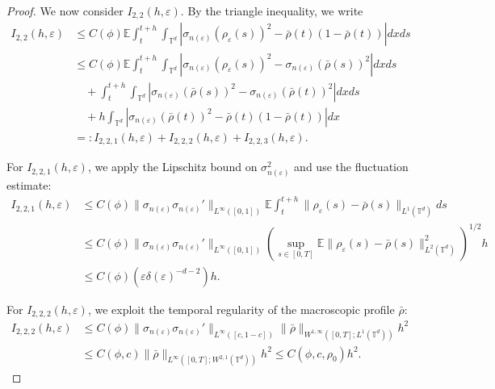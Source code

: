 \documentclass[10pt,a4paper]{amsart}
\def\leq{\leqslant}
\begin{document}
\begin{proof}
\medskip

We now consider $ I_{2,2}(h,\varepsilon) $. By the triangle inequality, we write
\begin{align*}
I_{2,2}(h,\varepsilon)
&\leq C(\phi) \mathbb{E} \int_t^{t+h} \int_{\mathbb{T}^d} \left| \sigma_{n(\varepsilon)}(\rho_{\varepsilon}(s))^2 - \bar{\rho}(t)(1 - \bar{\rho}(t)) \right| dx ds \\
&\leq C(\phi) \mathbb{E} \int_t^{t+h} \int_{\mathbb{T}^d} \left| \sigma_{n(\varepsilon)}(\rho_{\varepsilon}(s))^2 - \sigma_{n(\varepsilon)}(\bar{\rho}(s))^2 \right| dx ds \\
&\quad + \int_t^{t+h} \int_{\mathbb{T}^d} \left| \sigma_{n(\varepsilon)}(\bar{\rho}(s))^2 - \sigma_{n(\varepsilon)}(\bar{\rho}(t))^2 \right| dx ds \\
&\quad + h \int_{\mathbb{T}^d} \left| \sigma_{n(\varepsilon)}(\bar{\rho}(t))^2 - \bar{\rho}(t)(1 - \bar{\rho}(t)) \right| dx \\
&=: I_{2,2,1}(h,\varepsilon) + I_{2,2,2}(h,\varepsilon) + I_{2,2,3}(h,\varepsilon).
\end{align*}

For $ I_{2,2,1}(h,\varepsilon) $, we apply the Lipschitz bound on $ \sigma_{n(\varepsilon)}^2 $ and use the fluctuation estimate:
\begin{align*}
I_{2,2,1}(h,\varepsilon)
&\leq C(\phi) \| \sigma_{n(\varepsilon)} \sigma_{n(\varepsilon)}' \|_{L^{\infty}([0,1])} 
\mathbb{E} \int_t^{t+h} \| \rho_{\varepsilon}(s) - \bar{\rho}(s) \|_{L^1(\mathbb{T}^d)} ds \\
&\leq C(\phi) \| \sigma_{n(\varepsilon)} \sigma_{n(\varepsilon)}' \|_{L^{\infty}([0,1])} 
\left( \sup_{s \in [0,T]} \mathbb{E} \| \rho_{\varepsilon}(s) - \bar{\rho}(s) \|_{L^2(\mathbb{T}^d)}^2 \right)^{1/2} h \\
&\leq C(\phi) \left( \varepsilon \delta(\varepsilon)^{-d-2} \right) h.
\end{align*}

For $ I_{2,2,2}(h,\varepsilon) $, we exploit the temporal regularity of the macroscopic profile $ \bar{\rho} $:
\begin{align*}
I_{2,2,2}(h,\varepsilon)
&\leq C(\phi) \| \sigma_{n(\varepsilon)}\sigma_{n(\varepsilon)}' \|_{L^{\infty}([c,1-c])} 
\| \bar{\rho} \|_{W^{1,\infty}([0,T]; L^1(\mathbb{T}^d))} h^2 \\
&\leq C(\phi, c) \| \bar{\rho} \|_{L^{\infty}([0,T]; W^{2,1}(\mathbb{T}^d))} h^2 
\leq C(\phi, c, \rho_0) h^2.
\end{align*}


\end{proof}
\end{document}
